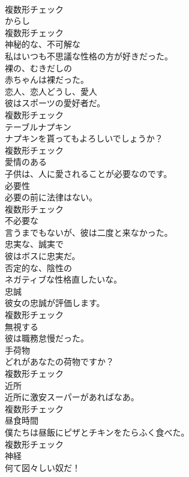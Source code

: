 \documentclass[8pt]{extreport}
\begin{document}
\begin{CJK}{UTF8}{min}
\\	複数形チェック
\\	[名詞]	からし	
\\	複数形チェック
\\	[形容詞]	神秘的な、不可解な	
\\	私はいつも不思議な性格の方が好きだった。	
\\	[形容詞]	裸の、むきだしの	
\\	赤ちゃんは裸だった。	
\\	[名詞]	恋人、恋人どうし、愛人	
\\	彼はスポーツの愛好者だ。	
\\	複数形チェック
\\	[名詞]	テーブルナプキン	
\\	ナプキンを貰ってもよろしいでしょうか？	
\\	複数形チェック
\\	[形容詞]	愛情のある	
\\	子供は、人に愛されることが必要なのです。	
\\	[名詞]	必要性	
\\	必要の前に法律はない。	
\\	複数形チェック
\\	[形容詞]	不必要な	
\\	言うまでもないが、彼は二度と来なかった。	
\\	[形容詞]	忠実な、誠実で	
\\	彼はボスに忠実だ。	
\\	[形容詞]	否定的な、陰性の	
\\	ネガティブな性格直したいな。	
\\	[名詞]	忠誠	
\\	彼女の忠誠が評価します。	
\\	複数形チェック
\\	[動詞]	無視する	
\\	彼は職務怠慢だった。	
\\	[名詞]	手荷物	
\\	どれがあなたの荷物ですか？	
\\	複数形チェック
\\	[名詞]	近所	
\\	近所に激安スーパーがあればなあ。	
\\	複数形チェック
\\	[名詞]	昼食時間	
\\	僕たちは昼飯にピザとチキンをたらふく食べた。	
\\	複数形チェック
\\	[名詞]	神経	
\\	何て図々しい奴だ！	

\end{CJK}
\end{document}
